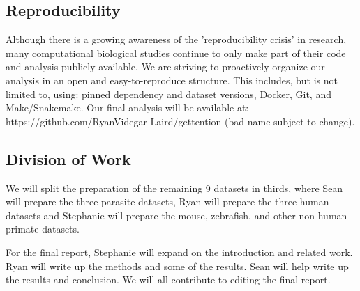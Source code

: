 \documentclass{article}
\begin{document}
\subsection{Reproducibility}

Although there is a growing awareness of the 'reproducibility  crisis' in research, many computational biological studies continue to only make part of their code and analysis publicly available. We are striving to proactively organize our analysis in an open and easy-to-reproduce structure. This includes, but is not limited to, using: pinned dependency and dataset versions, Docker, Git, and Make/Snakemake. Our final analysis will be available at: https://github.com/RyanVidegar-Laird/gettention (bad name subject to change).


\subsection{Division of Work}
We will split the preparation of the remaining 9 datasets in thirds, where Sean will prepare the three parasite datasets, Ryan will prepare the three human datasets and Stephanie will prepare the mouse, zebrafish, and other non-human primate datasets.

For the final report, Stephanie will expand on the introduction and related work. Ryan will write up the methods and some of the results. Sean will help write up the results and conclusion. We will all contribute to editing the final report.



\end{document}
